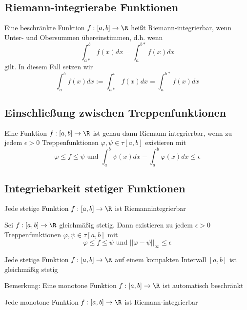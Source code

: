 	\subsection{Riemann-integrierabe Funktionen}
		\begin{Definition} 
			Eine beschränkte Funktion $f:[a, b]\to\R$ heißt Riemann-integrierbar, wenn Unter- und Obersummen übereinstimmen, d.h. wenn
			$$
				\int_{a*}^bf(x)dx=\int_a^{b*}f(x)dx
			$$
			gilt. In diesem Fall setzen wir
			$$
				\int_a^bf(x)dx:=\int_{a*}^bf(x)dx=\int_a^{b*}f(x)dx
			$$
		\end{Definition}
	\subsection{Einschließung zwischen Treppenfunktionen}
		\begin{Satz} [ ]
			Eine Funktion $f:[a, b]\to \R$ ist genau dann Riemann-integrierbar, wenn zu jedem $\epsilon>0$ Treppenfunktionen $\varphi, \psi\in\tau[a, b]$ existieren mit
			$$
				\varphi\leq f\leq\psi \text{ und } \int_a^b\psi(x)dx-\int_a^b\varphi(x)dx\leq\epsilon
			$$
		\end{Satz}
	\subsection{Integriebarkeit stetiger Funktionen}
		\begin{Satz} [ ]
			Jede stetige Funktion $f:[a, b]\to\R$ ist Riemannintegrierbar
		\end{Satz}
		\begin{Satz} [ ]
			Sei $f: [a, b]\to\R$ gleichmäßig stetig. Dann existieren zu jedem $\epsilon>0$ Treppenfunktionen $\varphi,\psi\in\tau[a, b]$ mit
			$$
				\varphi\leq f\leq\psi \text{ und } ||\varphi-\psi||_\infty\leq\epsilon
			$$
		\end{Satz}
		\begin{Satz} [ ]
			Jede stetige Funktion $f:[a, b]\to\R$ auf einem kompakten Intervall $[a, b]$ ist gleichmäßig stetig
		\end{Satz}
		Bemerkung:\newline
		Eine monotone Funktion $f:[a, b]\to\R$ ist automatisch beschränkt
		\begin{Satz} [ ]
			Jede monotone Funktion $f:[a, b]\to\R$ ist Riemann-integrierbar
		\end{Satz}
